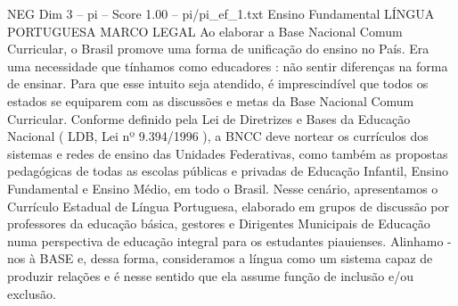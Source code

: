 \begin{textsample}{NEG Dim 3 – pi – Score 1.00 – pi/pi\_ef\_1.txt}  \label{ex:f3_neg_035}
Ensino Fundamental LÍNGUA PORTUGUESA MARCO LEGAL Ao elaborar a Base Nacional Comum Curricular, o Brasil promove uma forma de unificação do ensino no País.
Era uma necessidade que tínhamos como educadores : não sentir diferenças na forma de ensinar.
Para que esse intuito seja atendido, é imprescindível que todos os estados se equiparem com as discussões e metas da Base Nacional Comum Curricular.
Conforme definido pela Lei de Diretrizes e Bases da Educação Nacional ( LDB, Lei nº 9.394/1996 ), a BNCC deve nortear os currículos dos sistemas e redes de ensino das Unidades Federativas, como também as propostas pedagógicas de todas as escolas públicas e privadas de Educação Infantil, Ensino Fundamental e Ensino Médio, em todo o Brasil.
Nesse cenário, apresentamos o Currículo Estadual de Língua Portuguesa, elaborado em grupos de discussão por professores da educação básica, gestores e Dirigentes Municipais de Educação numa perspectiva de educação integral para os estudantes piauienses.
Alinhamo -nos à BASE e, dessa forma, consideramos a língua como um sistema capaz de produzir relações e é nesse sentido que ela assume função de inclusão e/ou exclusão.

\end{textsample}
